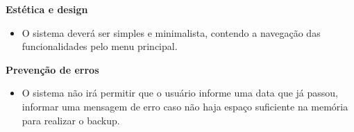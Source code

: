 \textbf{Estética e design}
\begin{itemize}
	\item O sistema deverá ser simples e minimalista, contendo a navegação das funcionalidades pelo menu principal.
\end{itemize}

\textbf{Prevenção de erros}
\begin{itemize}
	\item O sistema não irá permitir que o usuário informe uma data que já passou, informar uma mensagem de erro caso não haja espaço suficiente na memória para realizar o backup.
\end{itemize}